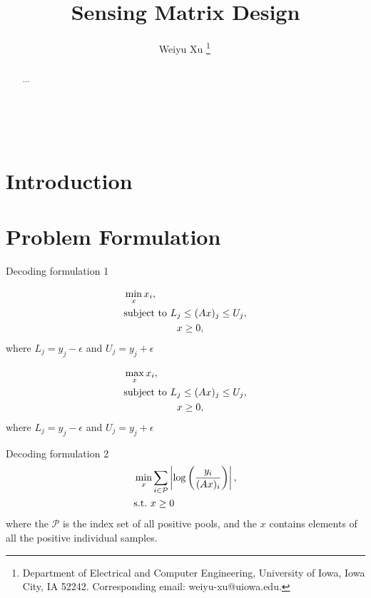 \documentclass{article}
\theoremstyle{remark}
\begin{document}
\title{Sensing Matrix Design}

\author{
Weiyu Xu {\footnote{
Department of Electrical and Computer Engineering, University of Iowa, Iowa City, IA 52242. Corresponding email: weiyu-xu@uiowa.edu.}}\,}\,



\maketitle
\begin{abstract}

...

\end{abstract}



\section{Introduction}\label{Sec:Introduction}




\section{Problem Formulation}
\label{sec:problemformulation}

Decoding formulation 1

\begin{align}\label{Eq:Min}
& \min_x x_i, \nonumber\\
& {\rm subject\ to\ }L_j \leq (Ax)_j \leq U_j,\nonumber\\
& \quad\quad\quad\quad\quad\ x\geq 0,
\end{align}
where $L_j=y_j-\epsilon$ and $U_j = y_j+\epsilon$

\begin{align}\label{Eq:Max}
& \max_x x_i, \nonumber\\
& {\rm subject\ to\ }L_j \leq (Ax)_j \leq U_j,\nonumber\\
& \quad\quad\quad\quad\quad\ x\geq 0,
\end{align}
where $L_j=y_j-\epsilon$ and $U_j = y_j+\epsilon$

Decoding formulation 2
\begin{align}\label{Eq:Logratio_min}
& \min_x \sum_{i\in \mathcal{P}} \left|\log\left(\frac{y_i}{(Ax)_i}\right)\right|, \nonumber\\
& {\rm s.t.\ }x\geq 0
\end{align}
where the $\mathcal{P}$ is the index set of all positive pools, and the $x$ contains elements of all the positive individual samples.
\end{document}

